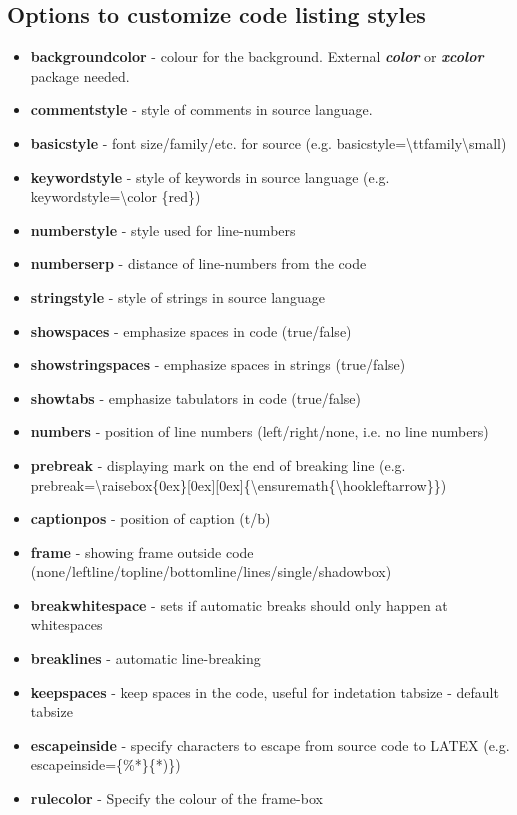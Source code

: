 \subsection{Options to customize code listing styles}
\begin{itemize}
	\item \textbf{backgroundcolor} - colour for the background. External \textit{\bfseries color} or \textit{\bfseries xcolor} package needed.
	\item \textbf{commentstyle} - style of comments in source language.
	\item \textbf{basicstyle} - font size/family/etc. for source (e.g. basicstyle=\textbackslash ttfamily\textbackslash small)
	\item \textbf{keywordstyle} - style of keywords in source language (e.g. keywordstyle=\textbackslash color \{red\})
	\item \textbf{numberstyle} - style used for line-numbers
	\item \textbf{numberserp} - distance of line-numbers from the code
	\item \textbf{stringstyle} - style of strings in source language
	\item \textbf{showspaces} - emphasize spaces in code (true/false)
	\item \textbf{showstringspaces} - emphasize spaces in strings (true/false)
	\item \textbf{showtabs} - emphasize tabulators in code (true/false)
	\item \textbf{numbers} - position of line numbers (left/right/none, i.e. no line numbers)
	\item \textbf{prebreak} - displaying mark on the end of breaking line (e.g. prebreak=\textbackslash raisebox\{0ex\}[0ex][0ex]\{\textbackslash ensuremath\{\textbackslash hookleftarrow\}\})
	\item \textbf{captionpos} - position of caption (t/b)
	\item \textbf{frame} - showing frame outside code (none/leftline/topline/bottomline/lines/single/shadowbox)
	\item \textbf{breakwhitespace} - sets if automatic breaks should only happen at whitespaces
	\item \textbf{breaklines} - automatic line-breaking
	\item \textbf{keepspaces} - keep spaces in the code, useful for indetation
		tabsize - default tabsize
	\item \textbf{escapeinside} - specify characters to escape from source code to LATEX (e.g. escapeinside=\{\%*\}\{*)\})
	\item \textbf{rulecolor} - Specify the colour of the frame-box
\end{itemize}

